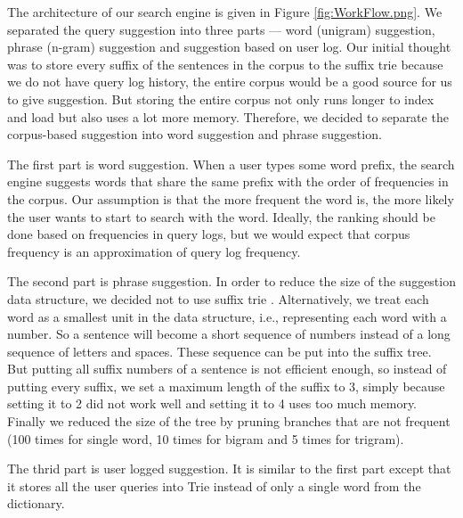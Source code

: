 \documentclass{article}
\begin{document}
The architecture of our search engine is given in Figure \ref{fig:WorkFlow.png}. We separated the query suggestion into three parts --- word (unigram) suggestion, phrase (n-gram) suggestion and suggestion based on user log. Our initial thought was to store every suffix of the sentences in the corpus to the suffix trie because we do not have query log history, the entire corpus would be a good source for us to give suggestion. But storing the entire corpus not only runs longer to index and load but also uses a lot more memory. Therefore, we decided to separate the corpus-based suggestion into word suggestion and phrase suggestion.

The first part is word suggestion. When a user types some word prefix, the search engine suggests words that share the same prefix with the order of frequencies in the corpus. Our assumption is that the more frequent the word is, the more likely the user wants to start to search with the word. Ideally, the ranking should be done based on frequencies in query logs, but we would expect that corpus frequency is an approximation of query log frequency.

The second part is phrase suggestion. In order to reduce the size of the suggestion data structure, we decided not to use suffix trie \cite{intro}. Alternatively, we treat each word as a smallest unit in the data structure, i.e., representing each word with a number. So a sentence will become a short sequence of numbers instead of a long sequence of letters and spaces. These sequence can be put into the suffix tree. But putting all suffix numbers of a sentence is not efficient enough, so instead of putting every suffix, we set a maximum length of the suffix to 3, simply because setting it to 2 did not work well and setting it to 4 uses too much memory. Finally we reduced the size of the tree by pruning branches that are not frequent (100 times for single word, 10 times for bigram and 5 times for trigram).

The thrid part is user logged suggestion. It is similar to the first part except that it stores all the user queries into Trie instead of only a single word from the dictionary.
\end{document}
